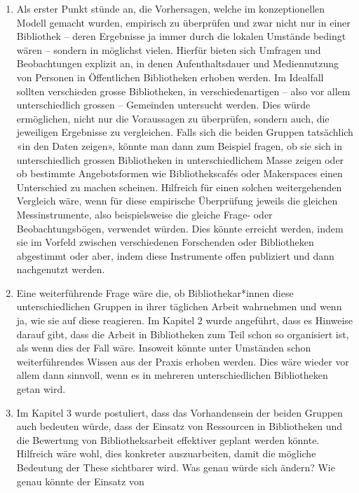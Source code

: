 \documentclass[a4paper,
fontsize=11pt,
oneside,
numbers=noperiodatend,
parskip=half-,
bibliography=totoc,
final
]{scrartcl}
\begin{document}
\begin{enumerate}
\def\labelenumi{\arabic{enumi}.}
\item
  Als erster Punkt stünde an, die Vorhersagen, welche im konzeptionellen
  Modell gemacht wurden, empirisch zu überprüfen und zwar nicht nur in
  einer Bibliothek -- deren Ergebnisse ja immer durch die lokalen
  Umstände bedingt wären -- sondern in möglichst vielen. Hierfür bieten
  sich Umfragen und Beobachtungen explizit an, in denen Aufenthaltsdauer
  und Mediennutzung von Personen in Öffentlichen Bibliotheken erhoben
  werden. Im Idealfall sollten verschieden grosse Bibliotheken, in
  verschiedenartigen -- also vor allem unterschiedlich grossen --
  Gemeinden untersucht werden. Dies würde ermöglichen, nicht nur die
  Voraussagen zu überprüfen, sondern auch, die jeweiligen Ergebnisse zu
  vergleichen. Falls sich die beiden Gruppen tatsächlich «in den Daten
  zeigen», könnte man dann zum Beispiel fragen, ob sie sich in
  unterschiedlich grossen Bibliotheken in unterschiedlichem Masse zeigen
  oder ob bestimmte Angebotsformen wie Bibliothekscafés oder Makerspaces
  einen Unterschied zu machen scheinen. Hilfreich für einen solchen
  weitergehenden Vergleich wäre, wenn für diese empirische Überprüfung
  jeweils die gleichen Messinstrumente, also beispielsweise die gleiche
  Frage- oder Beobachtungsbögen, verwendet würden. Dies könnte erreicht
  werden, indem sie im Vorfeld zwischen verschiedenen Forschenden oder
  Bibliotheken abgestimmt oder aber, indem diese Instrumente offen
  publiziert und dann nachgenutzt werden.
\item
  Eine weiterführende Frage wäre die, ob Bibliothekar*innen diese
  unterschiedlichen Gruppen in ihrer täglichen Arbeit wahrnehmen und
  wenn ja, wie sie auf diese reagieren. Im Kapitel 2 wurde angeführt,
  dass es Hinweise darauf gibt, dass die Arbeit in Bibliotheken zum Teil
  schon so organisiert ist, als wenn dies der Fall wäre. Insoweit könnte
  unter Umständen schon weiterführendes Wissen aus der Praxis erhoben
  werden. Dies wäre wieder vor allem dann sinnvoll, wenn es in mehreren
  unterschiedlichen Bibliotheken getan wird.
\item
  Im Kapitel 3 wurde postuliert, dass das Vorhandensein der beiden
  Gruppen auch bedeuten würde, dass der Einsatz von Ressourcen in
  Bibliotheken und die Bewertung von Bibliotheksarbeit effektiver
  geplant werden könnte. Hilfreich wäre wohl, dies konkreter
  auszuarbeiten, damit die mögliche Bedeutung der These sichtbarer wird.
  Was genau würde sich ändern? Wie genau könnte der Einsatz von

\end{enumerate}
\end{document}
